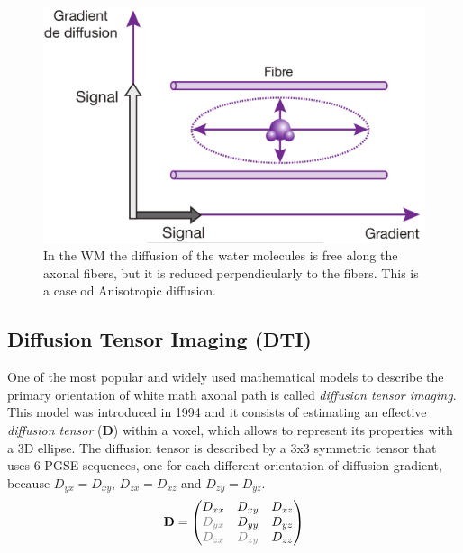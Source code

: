  \begin{figure}[h]
    \centering
    \begin{minipage}[c]{0.4\textwidth}
      \includegraphics[width=\textwidth]{images/anisotropi.png}
    \end{minipage}\hfill
    \begin{minipage}[b]{0.5\textwidth}
      \caption{In the WM the diffusion of the water molecules is free along the axonal fibers, but it is reduced perpendicularly to the fibers. This is a case od Anisotropic diffusion. \cite{KastlerVetterIRM}}
      \label{fig:isotropiAnisotropi}
    \end{minipage}
 \end{figure}

 \subsection{Diffusion Tensor Imaging (DTI)}
 One of the most popular and widely used mathematical models to describe the primary orientation of white math axonal path is called \emph{diffusion tensor imaging}. This model was introduced in 1994 \cite{basser1994mr} and it consists of estimating an effective \emph{diffusion tensor} ($\mathbf{D}$) within a voxel, which allows to represent its properties with a 3D ellipse. The diffusion tensor is described by a 3x3 symmetric tensor that uses 6 PGSE sequences, one for each different orientation of diffusion gradient, because $D_{yx}=D_{xy}$, $D_{zx}=D_{xz}$ and $D_{zy}=D_{yz}$.
 \begin{equation}
    \mathbf{D} = 
    \begin{pmatrix}
        D_{xx} & D_{xy} & D_{xz} \\
        \textcolor{gray}{D_{yx}} & D_{yy} & D_{yz} \\
        \textcolor{gray}{D_{zx}} & \textcolor{gray}{D_{zy}} & D_{zz}
    \end{pmatrix}
 \end{equation}

